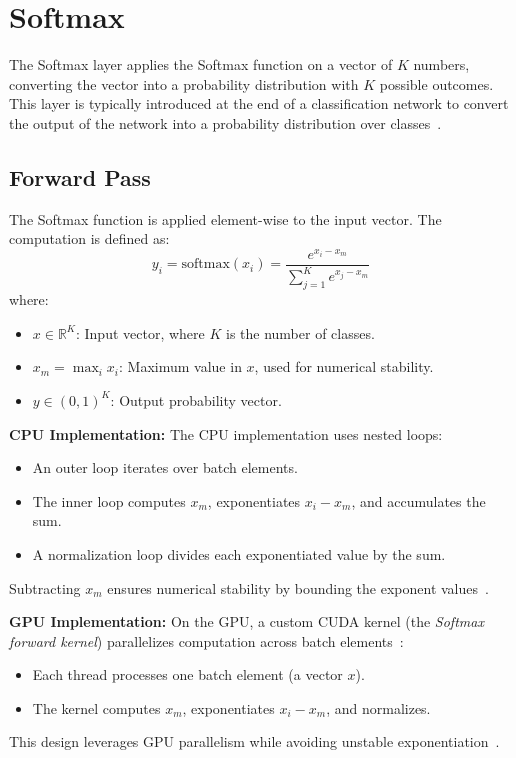 \section{Softmax}

The Softmax layer applies the Softmax function on a vector of \( K \) numbers, converting the vector into a probability distribution with \( K \) possible outcomes. This layer is typically introduced at the end of a classification network to convert the output of the network into a probability distribution over classes~\cite{bishop2006pattern, goodfellow2016deep}.

\subsection{Forward Pass}

The Softmax function is applied element-wise to the input vector. The computation is defined as:
\[
    y_i = \text{softmax}(x_i) = \frac{e^{x_i - x_m}}{\sum_{j=1}^K e^{x_j - x_m}}
\]
where:
\begin{itemize}
    \item \( x \in \mathbb{R}^K \): Input vector, where \( K \) is the number of classes.
    \item \( x_m = \max_i x_i \): Maximum value in \( x \), used for numerical stability.
    \item \( y \in (0, 1)^K \): Output probability vector.
\end{itemize}

\textbf{CPU Implementation:}  
The CPU implementation uses nested loops:
\begin{itemize}
    \item An outer loop iterates over batch elements.
    \item The inner loop computes \( x_m \), exponentiates \( x_i - x_m \), and accumulates the sum.
    \item A normalization loop divides each exponentiated value by the sum.
\end{itemize}
Subtracting \( x_m \) ensures numerical stability by bounding the exponent values~\cite{goodfellow2016deep}.

\textbf{GPU Implementation:}  
On the GPU, a custom CUDA kernel (the \textit{Softmax forward kernel}) parallelizes computation across batch elements~\cite{nvidia_cudnn}:
\begin{itemize}
    \item Each thread processes one batch element (a vector \( x \)).
    \item The kernel computes \( x_m \), exponentiates \( x_i - x_m \), and normalizes.
\end{itemize}
This design leverages GPU parallelism while avoiding unstable exponentiation~\cite{digitalocean_gpu_opt}.

